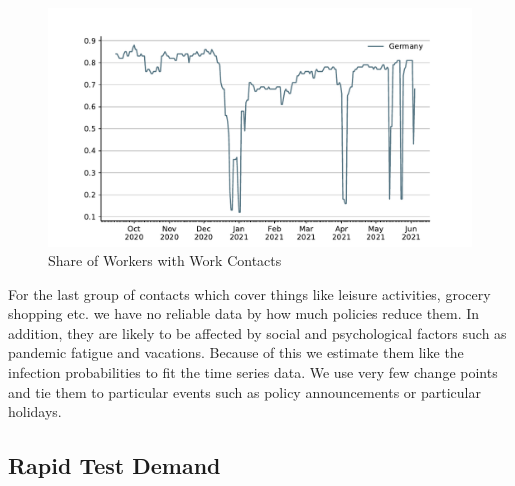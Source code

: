 \begin{figure}[ht]
    \centering
    \includegraphics[width=\textwidth]{../figures/results/figures/data/work_multiplier_since_sep}
    \caption{Share of Workers with Work Contacts}
    \label{fig:work_multiplier}
\end{figure}


For the last group of contacts which cover things like leisure activities, grocery
shopping etc. we have no reliable data by how much policies reduce them.
In addition, they are likely to be affected by social and psychological factors such as
pandemic fatigue and vacations. Because of this we estimate them like the infection
probabilities to fit the time series data. We use very few change points and tie them to
particular events such as policy announcements or particular holidays.

\FloatBarrier

\subsection{Rapid Test Demand}


